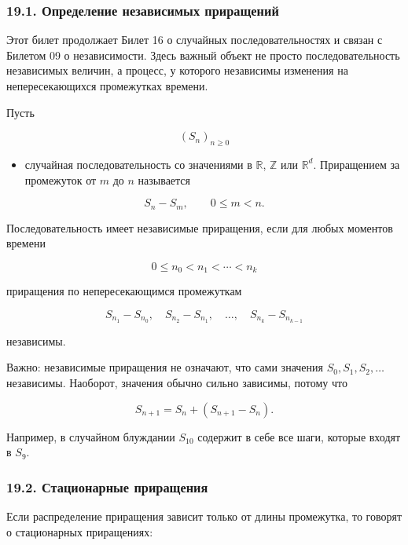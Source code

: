 \documentclass[
  11pt,
  a4paper,
]{article}
\providecommand{\tightlist}{%
  \setlength{\itemsep}{0pt}\setlength{\parskip}{0pt}}
\begin{document}
\subsubsection{19.1. Определение независимых
приращений}\label{ux43eux43fux440ux435ux434ux435ux43bux435ux43dux438ux435-ux43dux435ux437ux430ux432ux438ux441ux438ux43cux44bux445-ux43fux440ux438ux440ux430ux449ux435ux43dux438ux439}

Этот билет продолжает Билет 16 о случайных последовательностях и связан
с Билетом 09 о независимости. Здесь важный объект не просто
последовательность независимых величин, а процесс, у которого независимы
изменения на непересекающихся промежутках времени.

Пусть

\[
(S_n)_{n\ge0}
\]

\begin{itemize}
\tightlist
\item
  случайная последовательность со значениями в \(\mathbb R\),
  \(\mathbb Z\) или \(\mathbb R^d\). Приращением за промежуток от \(m\)
  до \(n\) называется
\end{itemize}

\[
S_n-S_m,
\qquad
0\le m<n.
\]

Последовательность имеет независимые приращения, если для любых моментов
времени

\[
0\le n_0<n_1<\cdots<n_k
\]

приращения по непересекающимся промежуткам

\[
S_{n_1}-S_{n_0},\quad
S_{n_2}-S_{n_1},\quad\ldots,\quad
S_{n_k}-S_{n_{k-1}}
\]

независимы.

Важно: независимые приращения не означают, что сами значения
\(S_0,S_1,S_2,\ldots\) независимы. Наоборот, значения обычно сильно
зависимы, потому что

\[
S_{n+1}=S_n+(S_{n+1}-S_n).
\]

Например, в случайном блуждании \(S_{10}\) содержит в себе все шаги,
которые входят в \(S_9\).

\subsubsection{19.2. Стационарные
приращения}\label{ux441ux442ux430ux446ux438ux43eux43dux430ux440ux43dux44bux435-ux43fux440ux438ux440ux430ux449ux435ux43dux438ux44f}

Если распределение приращения зависит только от длины промежутка, то
говорят о стационарных приращениях:
\end{document}
